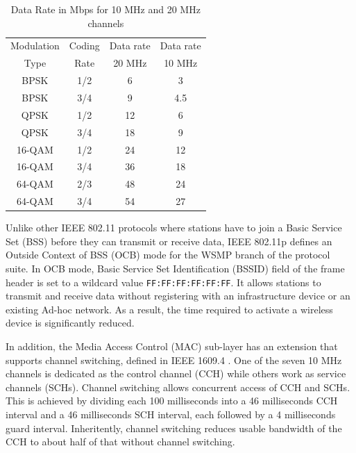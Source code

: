\documentclass[12pt]{report}
\begin{document}
\begin{table}[htb]
  \begin{center}
    \begin{tabular}{|c|c|c|c|}
      \hline
      Modulation & Coding & Data rate & Data rate     \\
      Type       & Rate   & 20 MHz    & 10 MHz        \\\hline
      BPSK       & 1/2    & 6         & 3             \\\hline
      BPSK       & 3/4    & 9         & 4.5           \\\hline
      QPSK       & 1/2    & 12        & 6             \\\hline
      QPSK       & 3/4    & 18        & 9             \\\hline
      16-QAM     & 1/2    & 24        & 12            \\\hline
      16-QAM     & 3/4    & 36        & 18            \\\hline
      64-QAM     & 2/3    & 48        & 24            \\\hline
      64-QAM     & 3/4    & 54        & 27            \\\hline
    \end{tabular}
    \caption{\label{tab:data_rate}Data Rate in Mbps for 10 MHz and 20 MHz channels}
  \end{center}
\end{table}

Unlike other IEEE 802.11 protocols where stations have to join a Basic Service Set (BSS) before they can transmit or receive data, IEEE 802.11p defines an Outside Context of BSS (OCB) mode for the WSMP branch of the protocol suite. In OCB mode, Basic Service Set Identification (BSSID) field of the frame header is set to a wildcard value \texttt{FF:FF:FF:FF:FF:FF}. It allows stations to transmit and receive data without registering with an infrastructure device or an existing Ad-hoc network. As a result, the time required to activate a wireless device is significantly reduced.

In addition, the Media Access Control (MAC) sub-layer has an extension that supports channel switching, defined in IEEE 1609.4 \cite{ieee16094}. One of the seven 10 MHz channels is dedicated as the control channel (CCH) while others work as service channels (SCHs). Channel switching allows concurrent access of CCH and SCHs. This is achieved by dividing each 100 milliseconds into a 46 milliseconds CCH interval and a 46 milliseconds SCH interval, each followed by a 4 milliseconds guard interval. Inheritently, channel switching reduces usable bandwidth of the CCH to about half of that without channel switching.
\end{document}

